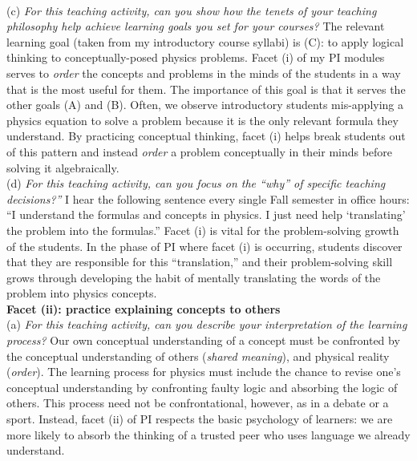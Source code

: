 \documentclass[../../../main.tex]{subfiles}
\begin{document}
\\
\vspace{0.25cm}
(c) \textit{For this teaching activity, can you show how the tenets of your teaching philosophy help achieve learning goals you set for your courses?}  The relevant learning goal (taken from my introductory course syllabi) is (C): to apply logical thinking to conceptually-posed physics problems.  Facet (i) of my PI modules serves to \textit{order} the concepts and problems in the minds of the students in a way that is the most useful for them.  The importance of this goal is that it serves the other goals (A) and (B).  Often, we observe introductory students mis-applying a physics equation to solve a problem because it is the only relevant formula they understand.  By practicing conceptual thinking, facet (i) helps break students out of this pattern and instead \textit{order} a problem conceptually in their minds before solving it algebraically.
\\
\vspace{0.25cm}
(d) \textit{For this teaching activity, can you focus on the ``why'' of specific teaching decisions?''}  I hear the following sentence every single Fall semester in office hours: ``I understand the formulas and concepts in physics.  I just need help `translating' the problem into the formulas.''  Facet (i) is vital for the problem-solving growth of the students.  In the phase of PI where facet (i) is occurring, students discover that they are responsible for this ``translation,'' and their problem-solving skill grows through developing the habit of mentally translating the words of the problem into physics concepts.
\\
\vspace{0.25cm}
\textbf{Facet (ii): practice explaining concepts to others} 
\\
\vspace{0.25cm}
(a) \textit{For this teaching activity, can you describe your interpretation of the learning process?} Our own conceptual understanding of a concept must be confronted by the conceptual understanding of others (\textit{shared meaning}), and physical reality (\textit{order}).  The learning process for physics must include the chance to revise one's conceptual understanding by confronting faulty logic and absorbing the logic of others.  This process need not be confrontational, however, as in a debate or a sport.  Instead, facet (ii) of PI respects the basic psychology of learners: we are more likely to absorb the thinking of a trusted peer who uses language we already understand.
\end{document}
